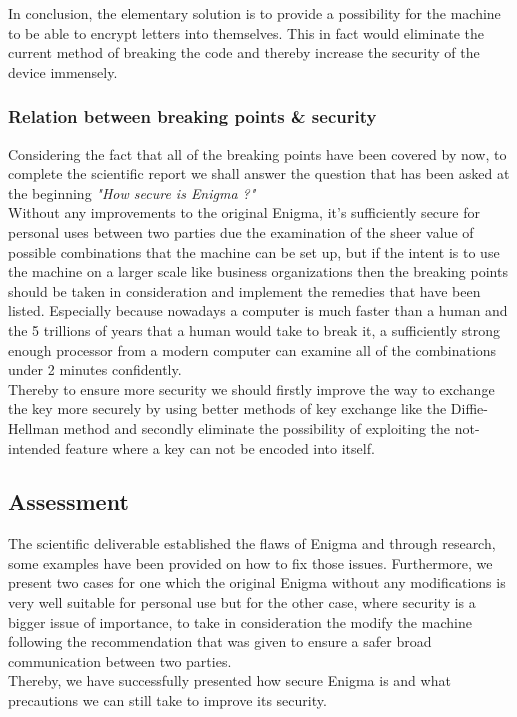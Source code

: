 \documentclass[conference,compsoc]{IEEEtran}
\begin{document}
In conclusion, the elementary solution is to provide a possibility for the machine to be able to encrypt letters into themselves. This in fact would eliminate the current method of breaking the code and thereby increase the security of the device immensely.\\

\subsubsection{Relation between breaking points \& security} Considering the fact that all of the breaking points have been covered by now, to complete the scientific report we shall answer the question that has been asked at the beginning \emph{"How secure is Enigma ?"}\\

Without any improvements to the original Enigma, it's sufficiently secure for personal uses between two parties due the examination of the sheer value of possible combinations that the machine can be set up, but if the intent is to use the machine on a larger scale like business organizations then the breaking points should be taken in consideration and implement the remedies that have been listed. Especially because nowadays a computer is much faster than a human and the 5 trillions of years that a human would take to break it, a sufficiently strong enough processor from a modern computer can examine all of the combinations under 2 minutes confidently.\\
Thereby to ensure more security we should firstly improve the way to exchange the key more securely by using better methods of key exchange like the Diffie-Hellman method and secondly eliminate the possibility of exploiting the not-intended feature where a key can not be encoded into itself.\\




\subsection{Assessment}
The scientific deliverable established the flaws of Enigma and through research, some examples have been provided on how to fix those issues. Furthermore, we present two cases for one which the original Enigma without any modifications is very well suitable for personal use but for the other case, where security is a bigger issue of importance, to take in consideration the modify the machine following the recommendation that was given to ensure a safer broad communication between two parties.\\
Thereby, we have successfully presented how secure Enigma is and what precautions we can still take to improve its security.\\
\end{document}
